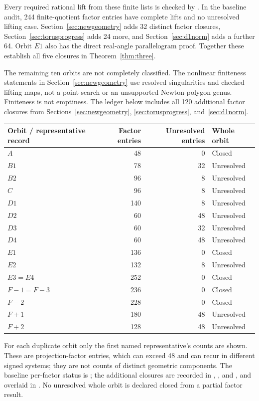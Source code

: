 \documentclass[11pt,letterpaper]{article}
\theoremstyle{definition}\newtheorem{definition}[theorem]{Definition}
\theoremstyle{remark}\newtheorem{remark}[theorem]{Remark}
\begin{document}
Every required rational lift from these finite lists is checked by . In the baseline audit, 244 finite-quotient factor entries have complete lifts and no unresolved lifting case. Section~\ref{sec:newgeometry} adds 32 distinct factor closures, Section~\ref{sec:torusprogress} adds 24 more, and Section~\ref{sec:d1norm} adds a further 64. Orbit $E1$ also has the direct real-angle parallelogram proof. Together these establish all five closures in Theorem~\ref{thm:three}.

The remaining ten orbits are not completely classified. The nonlinear finiteness statements in Section~\ref{sec:newgeometry} use resolved singularities and checked lifting maps, not a point search or an unsupported Newton-polygon genus. Finiteness is not emptiness. The ledger below includes all 120 additional factor closures from Sections~\ref{sec:newgeometry}, \ref{sec:torusprogress}, and~\ref{sec:d1norm}.


\begin{center}
\small
\begin{tabular}{lrrl}
\toprule
Orbit / representative record & Factor entries & Unresolved entries & Whole orbit\\
\midrule
$A$ & 48 & 0 & Closed \\
$B1$ & 78 & 32 & Unresolved \\
$B2$ & 96 & 8 & Unresolved \\
$C$ & 96 & 8 & Unresolved \\
$D1$ & 140 & 8 & Unresolved \\
$D2$ & 60 & 48 & Unresolved \\
$D3$ & 60 & 32 & Unresolved \\
$D4$ & 60 & 48 & Unresolved \\
$E1$ & 136 & 0 & Closed \\
$E2$ & 132 & 8 & Unresolved \\
$E3=E4$ & 252 & 0 & Closed \\
$F{-}1=F{-}3$ & 236 & 0 & Closed \\
$F{-}2$ & 228 & 0 & Closed \\
$F{+}1$ & 180 & 48 & Unresolved \\
$F{+}2$ & 128 & 48 & Unresolved \\
\bottomrule
\end{tabular}
\end{center}
For each duplicate orbit only the first named representative's counts are shown. These are projection-factor entries, which can exceed 48 and can recur in different signed systems; they are not counts of distinct geometric components. The baseline per-factor status is ; the additional closures are recorded in , , and , and overlaid in . No unresolved whole orbit is declared closed from a partial factor result.
\end{document}
